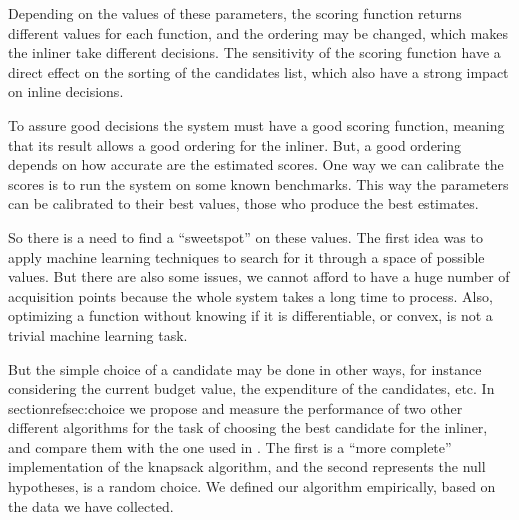 Depending on the values of these parameters, the scoring function returns
different values for each function, and the ordering may be changed, which
makes the inliner take different decisions. The sensitivity of the scoring
function have a direct effect on the sorting of the candidates list, which
also have a strong impact on inline decisions.

To assure good decisions the system must have a good scoring function,
meaning that its result allows a good ordering for the inliner. But, a good
ordering depends on how accurate are the estimated scores. One way we can
calibrate the scores is to run the system on some known benchmarks. This way
the parameters can be calibrated to their best values, those who produce
the best estimates.

So there is a need to find a ``sweetspot'' on these values. The first idea was
to apply machine learning techniques to search for it through a space of
possible values. But there are also some issues, we cannot afford to have a
huge number of acquisition points because the whole system takes a long time
to process. Also, optimizing a function without knowing if it is differentiable,
or convex, is not a trivial machine learning task.

But the simple choice of a candidate may be done in other ways, for instance
considering the current budget value, the expenditure of the candidates, etc.
In sectionref{sec:choice} we propose and measure the performance of two other
different algorithms for the task of choosing the best candidate for the
inliner, and compare them with the one used in .
The first is a ``more complete'' implementation of the knapsack algorithm,
and the second represents the null hypotheses, is a random choice. We defined
our algorithm empirically, based on the data we have collected.
